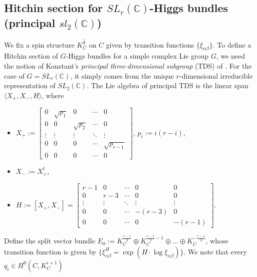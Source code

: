 \documentclass[oneside, 11pt]{amsart}
\theoremstyle{definition}
\numberwithin{equation}{subsection}
\def\a{\alpha}
\def\b{\beta}
\newcommand{\bC}{{\mathbb{C}}}
\newcommand{\la}{{\langle}}
\newcommand{\ra}{{\rangle}}
\newcommand{\half}{{\frac{1}{2}}}
\begin{document}
\subsection{Hitchin section for
$SL_r(\bC)$-Higgs bundles (principal $sl_2(\mathbb{C})$)}
\label{hitchin section}
We fix a  spin structure 
$K_C^{\half}$ on $C$ 
given by 
transition functions 
$\{\xi_{\a\b}\}$. 
To define
a Hitchin section of $G$-Higgs bundles
for a simple complex Lie group $G$, we
need the notion of Konstant's 
\emph{principal three-dimensional subgroup} (TDS)
of \cite{Kostant}.
For the case of $G=SL_r(\bC)$, it  simply comes from
the unique $r$-dimensional irreducible representation
of $SL_2(\bC)$. The Lie algebra of principal TDS
is the linear span  $\la X_+,X_-,H\ra$, 
where
\begin{itemize}
\item
$X_+:=\begin{bmatrix}
0&\sqrt{p_1}& 0 &\cdots &0\\
0&      0   & \sqrt{p_2} &\cdots &0\\
\vdots&\vdots&\vdots&\ddots&\vdots\\
0&      0   & 0           &\cdots  &\sqrt{p_{r-1}}\\
0&      0   & 0           & \cdots & 0
\end{bmatrix}$, \qquad $p_i:= i(r-i)$,
\item
$X_{-}:=X_{+}^{t},$ 
\item
$H:= [X_+,X_-]=\begin{bmatrix}
r-1&    0   &\cdots &   0 & 0\\
0&      r-3  &\cdots &  0 & 0\\
\vdots&\vdots&\ddots&\vdots&\vdots\\
0&      0              &\cdots  &-(r-3) & 0\\
0&      0             & \cdots & 0     & -(r-1)
\end{bmatrix} .$
\end{itemize}
 Define the split vector bundle $E_0:=K_C^{\frac{r-1}{2}}\oplus K_C^{\frac{r-1}{2}-1}\oplus \ldots \oplus K_C^{-\frac{r-1}{2}}$, whose
  transition function 
  is given by
   $\{\xi_{\a\b}^H=\exp(H\cdot \log\xi_{\a\b})\}$.
We note that every $q_i \in H^0\!\left(C, K_C^{i+1}\right)$
\end{document}

